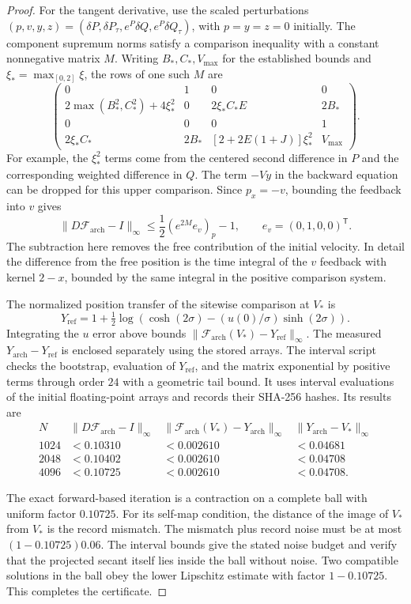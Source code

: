 \begin{proof}
For the tangent derivative, use the scaled perturbations
$(p,v,y,z)=(\delta P,\delta P_\tau,e^P\delta Q,
e^P\delta Q_\tau)$, with $p=y=z=0$ initially.
The component supremum norms satisfy a comparison
inequality with a constant nonnegative matrix $M$.
Writing $B_*,C_*,V_{\max}$ for the established bounds
and $\xi_*=\max_{[0,2]}\xi$, the rows of one such $M$ are
\[
 \begin{pmatrix}
 0&1&0&0\\
 2\max(B_*^2,C_*^2)+4\xi_*^2&0&2\xi_*C_*E&2B_*\\
 0&0&0&1\\
 2\xi_*C_*&2B_*&[2+2E(1+J)]\xi_*^2&V_{\max}
 \end{pmatrix}.
\]
For example, the $\xi_*^2$ terms come from the centered
second difference in $P$ and the corresponding weighted
difference in $Q$. The term $-V y$ in the backward
equation can be dropped for this upper comparison.
Since $p_x=-v$, bounding the feedback into $v$ gives
\[
 \|D\mathcal F_{\mathrm{arch}}-I\|_\infty
 \le \frac12 (e^{2M}e_v)_p-1 ,
 \qquad e_v=(0,1,0,0)^{\mathsf T}.
\]
The subtraction here removes the free contribution
of the initial velocity. In detail the difference from
the free position is the time integral of the $v$
feedback with kernel $2-x$, bounded by the same
integral in the positive comparison system.

The normalized position transfer of the sitewise
comparison at $V_*$ is
\[
 Y_{\mathrm{ref}}=
 1+\tfrac12\log\!\left(\cosh(2\sigma)
       -(u(0)/\sigma)\sinh(2\sigma)\right).
\]
Integrating the $u$ error above bounds
$\|\mathcal F_{\mathrm{arch}}(V_*)-Y_{\mathrm{ref}}\|_\infty$.
The measured $Y_{\mathrm{arch}}-Y_{\mathrm{ref}}$
is enclosed separately using the stored arrays.
The interval script checks the bootstrap,
evaluation of $Y_{\mathrm{ref}}$, and the matrix
exponential by positive terms through order $24$ with
a geometric tail bound. It uses interval evaluations
of the initial floating-point arrays and records
their SHA-256 hashes. Its results are
\[
\begin{array}{rccc}
 N&\|D\mathcal F_{\mathrm{arch}}-I\|_\infty
   &\|\mathcal F_{\mathrm{arch}}(V_*)-Y_{\mathrm{arch}}\|_\infty
   &\|Y_{\mathrm{arch}}-V_*\|_\infty\\ \hline
 1024&<0.10310&<0.002610&<0.04681\\
 2048&<0.10402&<0.002610&<0.04708\\
 4096&<0.10725&<0.002610&<0.04708 .
\end{array}
\]

The exact forward-based iteration is a contraction
on a complete ball with uniform factor $0.10725$.
For its self-map condition, the distance of the image
of $V_*$ from $V_*$ is the record mismatch.
The mismatch plus record noise must be at most
$(1-0.10725)0.06$. The interval bounds give the
stated noise budget and verify that the projected
secant itself lies inside the ball without noise.
Two compatible solutions in the ball obey the lower
Lipschitz estimate with factor $1-0.10725$.
This completes the certificate.
\end{proof}

